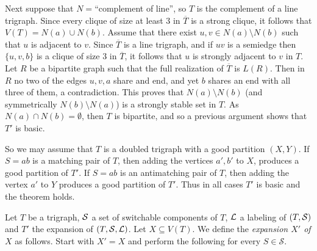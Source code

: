 \documentclass[11 pt] {article}
\newcommand\blackslug{\hbox{\hskip 1pt \vrule width 4pt height 8pt depth 1.5pt
        \hskip 1pt}}
\newcommand\bbox{\hfill \quad \blackslug \medbreak}
\begin{document}
Next suppose that $N=$``complement of line'', so $T$ is the complement
of a line trigraph.  Since every clique of size at least $3$ in
$\overline{T}$ is a strong clique, it follows that $V(T) = N(a) \cup
N(b)$. Assume that there exist $u,v \in N(a) \setminus N(b)$ such that
$u$ is adjacent to $v$. Since $\overline{T}$ is a line trigraph, and
if $uv$ is a semiedge then $\{u,v,b\}$ is a clique of size $3$ in
$\overline{T}$, it follows that $u$ is strongly adjacent to $v$ in
$T$. Let $R$ be a bipartite graph such that the full realization of
$\overline{T}$ is $L(R)$.  Then in $R$ no two of the edges $u,v,a$
share and end, and yet $b$ shares an end with all three of them, a
contradiction.  This proves that $N(a) \setminus N(b)$ (and
symmetrically $N(b) \setminus N(a)$) is a strongly stable set in
$T$. As $N(a) \cap N(b)=\emptyset$, then $T$ is bipartite, and so a
previous argument shows that $T'$ is basic.

 
So we may assume that $T$ is a doubled trigraph with a good partition
$(X, Y)$. If $S=ab$ is a matching pair of $T$, then adding the
vertices $a', b'$ to $X$, produces a good partition of $T'$.  If
$S=ab$ is an antimatching pair of $T$, then adding the vertex $a'$ to
$Y$ produces a good partition of $T'$. Thus in all cases $T'$ is basic
and the theorem holds.  \bbox


Let $T$ be a trigraph, $\cal S$ a set of switchable components of $T$,
$\cal L$ a labeling of $(T, {\cal S})$ and $T'$ the expansion of $(T,
{\cal S}, {\cal L})$.  Let $X \subseteq V(T)$.  We define the  \emph{expansion
  $X'$ of $X$} as follows. Start with $X'=X$ and perform the following for  every $S \in \mathcal {S}$. 
\end{document}
